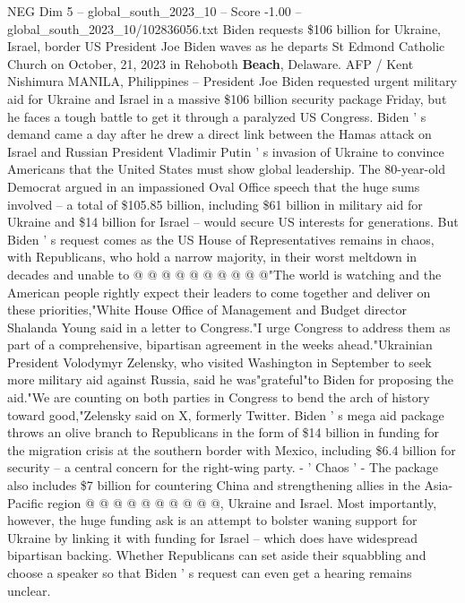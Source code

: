 \begin{textsample}{NEG Dim 5 – global\_south\_2023\_10 – Score -1.00 – global\_south\_2023\_10/102836056.txt}  \label{ex:f5_neg_093}
Biden requests \$106 billion for Ukraine, Israel, border US President Joe Biden waves as he departs St Edmond Catholic Church on October, 21, 2023 in Rehoboth \textbf{Beach}, Delaware.
AFP / Kent Nishimura MANILA, Philippines -- President Joe Biden requested urgent military aid for Ukraine and Israel in a massive \$106 billion security package Friday, but he faces a tough battle to get it through a paralyzed US Congress.
Biden ' s demand came a day after he drew a direct link between the Hamas attack on Israel and Russian President Vladimir Putin ' s invasion of Ukraine to convince Americans that the United States must show global leadership.
The 80-year-old Democrat argued in an impassioned Oval Office speech that the huge sums involved -- a total of \$105.85 billion, including \$61 billion in military aid for Ukraine and \$14 billion for Israel -- would secure US interests for generations.
But Biden ' s request comes as the US House of Representatives remains in chaos, with Republicans, who hold a narrow majority, in their worst meltdown in decades and unable to @ @ @ @ @ @ @ @ @ @"The world is watching and the American people rightly expect their leaders to come together and deliver on these priorities,"White House Office of Management and Budget director Shalanda Young said in a letter to Congress."I urge Congress to address them as part of a comprehensive, bipartisan agreement in the weeks ahead."Ukrainian President Volodymyr Zelensky, who visited Washington in September to seek more military aid against Russia, said he was"grateful"to Biden for proposing the aid."We are counting on both parties in Congress to bend the arch of history toward good,"Zelensky said on X, formerly Twitter.
Biden ' s mega aid package throws an olive branch to Republicans in the form of \$14 billion in funding for the migration crisis at the southern border with Mexico, including \$6.4 billion for security -- a central concern for the right-wing party. - ' Chaos ' - The package also includes \$7 billion for countering China and strengthening allies in the Asia-Pacific region @ @ @ @ @ @ @ @ @ @, Ukraine and Israel.
Most importantly, however, the huge funding ask is an attempt to bolster waning support for Ukraine by linking it with funding for Israel -- which does have widespread bipartisan backing.
Whether Republicans can set aside their squabbling and choose a speaker so that Biden ' s request can even get a hearing remains unclear.

\end{textsample}
